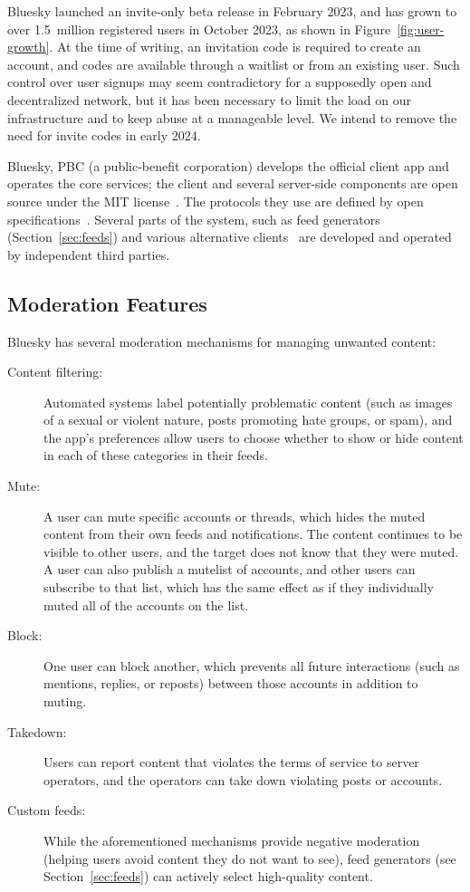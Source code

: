 \documentclass[sigconf,review]{acmart}
\begin{document}
Bluesky launched an invite-only beta release in February 2023, and has grown to over 1.5~million registered users in October 2023, as shown in Figure~\ref{fig:user-growth}.
At the time of writing, an invitation code is required to create an account, and codes are available through a waitlist or from an existing user.
Such control over user signups may seem contradictory for a supposedly open and decentralized network, but it has been necessary to limit the load on our infrastructure and to keep abuse at a manageable level.
We intend to remove the need for invite codes in early 2024.

Bluesky, PBC (a public-benefit corporation) develops the official client app and operates the core services; the client and several server-side components are open source under the MIT license~\cite{BlueskyGithub}.
The protocols they use are defined by open specifications~\cite{AtProtoSpecs}.
Several parts of the system, such as feed generators (Section~\ref{sec:feeds}) and various alternative clients~\cite{AtProtoClients} are developed and operated by independent third parties.

\subsection{Moderation Features}\label{sec:moderation}

Bluesky has several moderation mechanisms for managing unwanted content:
\begin{description}
    \item[Content filtering:] Automated systems label potentially problematic content (such as images of a sexual or violent nature, posts promoting hate groups, or spam), and the app's preferences allow users to choose whether to show or hide content in each of these categories in their feeds.
    \item[Mute:] A user can mute specific accounts or threads, which hides the muted content from their own feeds and notifications. The content continues to be visible to other users, and the target does not know that they were muted. A user can also publish a mutelist of accounts, and other users can subscribe to that list, which has the same effect as if they individually muted all of the accounts on the list.
    \item[Block:] One user can block another, which prevents all future interactions (such as mentions, replies, or reposts) between those accounts in addition to muting.
    \item[Takedown:] Users can report content that violates the terms of service to server operators, and the operators can take down violating posts or accounts.
    \item[Custom feeds:] While the aforementioned mechanisms provide negative moderation (helping users avoid content they do not want to see), feed generators (see Section~\ref{sec:feeds}) can actively select high-quality content.
\end{description}
\end{document}
